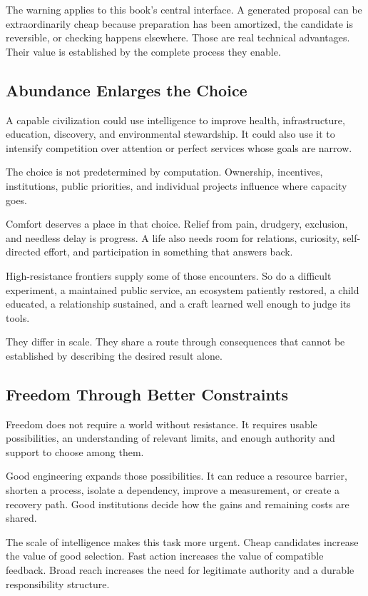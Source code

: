 \documentclass[11pt,openany]{book}
\begin{document}
The warning applies to this book's central interface. A generated proposal can be extraordinarily cheap because preparation has been amortized, the candidate is reversible, or checking happens elsewhere. Those are real technical advantages. Their value is established by the complete process they enable.

\subsection{Abundance Enlarges the Choice}

A capable civilization could use intelligence to improve health, infrastructure, education, discovery, and environmental stewardship. It could also use it to intensify competition over attention or perfect services whose goals are narrow.

The choice is not predetermined by computation. Ownership, incentives, institutions, public priorities, and individual projects influence where capacity goes.

Comfort deserves a place in that choice. Relief from pain, drudgery, exclusion, and needless delay is progress. A life also needs room for relations, curiosity, self-directed effort, and participation in something that answers back.

High-resistance frontiers supply some of those encounters. So do a difficult experiment, a maintained public service, an ecosystem patiently restored, a child educated, a relationship sustained, and a craft learned well enough to judge its tools.

They differ in scale. They share a route through consequences that cannot be established by describing the desired result alone.

\subsection{Freedom Through Better Constraints}

Freedom does not require a world without resistance. It requires usable possibilities, an understanding of relevant limits, and enough authority and support to choose among them.

Good engineering expands those possibilities. It can reduce a resource barrier, shorten a process, isolate a dependency, improve a measurement, or create a recovery path. Good institutions decide how the gains and remaining costs are shared.

The scale of intelligence makes this task more urgent. Cheap candidates increase the value of good selection. Fast action increases the value of compatible feedback. Broad reach increases the need for legitimate authority and a durable responsibility structure.
\end{document}
